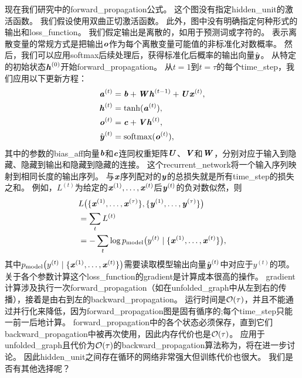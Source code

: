现在我们研究中的\gls{forward_propagation}公式。
这个图没有指定\gls{hidden_unit}的激活函数。
我们假设使用双曲正切激活函数。
此外，图中没有明确指定何种形式的输出和\gls{loss_function}。
我们假定输出是离散的，如用于预测词或字符的。
表示离散变量的常规方式是把输出$\boldsymbol{\mathit{o}}$作为每个离散变量可能值的非标准化对数概率。
然后，我们可以应用\gls{softmax}后续处理后，获得标准化后概率的输出向量$\hat {\boldsymbol{\mathit{y}}}$。
从特定的初始状态$\boldsymbol{\mathit{h}}^{(0)}$开始\gls{forward_propagation}。
从$t= 1$到$t = \tau$的每个\gls{time_step}，我们应用以下更新方程：
\begin{align}
\label{eq:108a}
 \boldsymbol{\mathit{a}}^{(t)} &= \boldsymbol{\mathit{b}} + \boldsymbol{\mathit{W}} \boldsymbol{\mathit{h}}^{(t-1)} + \boldsymbol{\mathit{U}} \boldsymbol{\mathit{x}}^{(t)}, \\
  \boldsymbol{\mathit{h}}^{(t)} &= \tanh(\boldsymbol{\mathit{a}}^{(t)} ), \\
  \boldsymbol{\mathit{o}}^{(t)} &= \boldsymbol{\mathit{c}} + \boldsymbol{\mathit{V}} \boldsymbol{\mathit{h}}^{(t)}, \\
  \hat {\boldsymbol{\mathit{y}}}^{(t)} &= \text{softmax}(\boldsymbol{\mathit{o}}^{(t)}),
\end{align}
其中的参数的\gls{bias_aff}向量$\boldsymbol{\mathit{b}}$和$\boldsymbol{\mathit{c}}$连同权重矩阵$\boldsymbol{\mathit{U}}$、$\boldsymbol{\mathit{V}}$和$\boldsymbol{\mathit{W}}$，分别对应于输入到隐藏、隐藏到输出和隐藏到隐藏的连接。
这个\gls{recurrent_network}将一个输入序列映射到相同长度的输出序列。
与$\boldsymbol{\mathit{x}}$序列配对的$\boldsymbol{\mathit{y}}$的总损失就是所有\gls{time_step}的损失之和。
例如，$L^{(t)}$为给定的$\boldsymbol{\mathit{x}}^{(1)}, \dots, \boldsymbol{\mathit{x}}^{(t)}$后$\boldsymbol{\mathit{y}}^{(t)}$的负对数似然，则
\begin{align} \label{eq:1012L}
 & L\big( \{ \boldsymbol{\mathit{x}}^{(1)}, \dots, \boldsymbol{\mathit{x}}^{(\tau)} \}, \{ \boldsymbol{\mathit{y}}^{(1)}, \dots, \boldsymbol{\mathit{y}}^{(\tau)}  \} \big) \\
 & = \sum_t L^{(t)} \\
 & = - \sum_t \log p_{\text{model}} \big(  y^{(t)} \mid  \{ \boldsymbol{\mathit{x}}^{(1)}, \dots, \boldsymbol{\mathit{x}}^{(t)} \} \big) ,
\end{align}
其中$p_{\text{model}} \big(  y^{(t)} \mid  \{ \boldsymbol{\mathit{x}}^{(1)}, \dots, \boldsymbol{\mathit{x}}^{(t)} \} \big) $需要读取模型输出向量$\hat {\boldsymbol{\mathit{y}}}^{(t)}$中对应于$y^{(t)}$的项。
关于各个参数计算这个\gls{loss_function}的\gls{gradient}是计算成本很高的操作。
\gls{gradient}计算涉及执行一次\gls{forward_propagation}（如在\gls{unfolded_graph}中从左到右的传播），接着是由右到左的\gls{backward_propagation}。
运行时间是$\mathcal{O}(\tau)$，并且不能通过并行化来降低，因为\gls{forward_propagation}图是固有循序的;每个\gls{time_step}只能一前一后地计算。
\gls{forward_propagation}中的各个状态必须保存，直到它们\gls{backward_propagation}中被再次使用，因此内存代价也是$\mathcal{O}(\tau)$。
应用于\gls{unfolded_graph}且代价为$\mathcal{O}(\tau)$的\gls{backward_propagation}算法称为，将在进一步讨论。
因此\gls{hidden_unit}之间存在循环的网络非常强大但训练代价也很大。
我们是否有其他选择呢？

